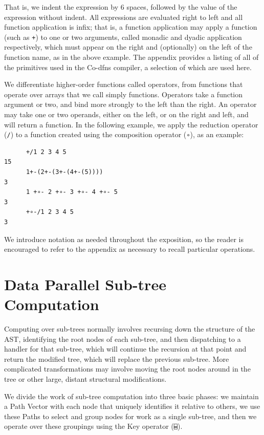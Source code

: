 ﻿\documentclass[numbers,10pt,preprint]{sigplanconf}
\begin{document}
\noindent That is, we indent the expression by 6 spaces, followed by the value of the expression without indent. All expressions are evaluated right to left and all function application is infix; that is, a function application may apply a function (such as \verb;+;) to one or two arguments, called monadic and dyadic application respectively, which must appear on the right and (optionally) on the left of the function name, as in the above example. The appendix provides a listing of all of the primitives used in the Co-dfns compiler, a selection of which are used here.

We differentiate higher-order functions called operators, from functions that operate over arrays that we call simply functions. Operators take a function argument or two, and bind more strongly to the left than the right. An operator may take one or two operands, either on the left, or on the right and left, and will return a function. In the following example, we apply the reduction operator (\verb;/;) to a function created using the composition operator (\verb;∘;), as an example:

\begin{verbatim}
      +/1 2 3 4 5
15
      1+-(2+-(3+-(4+-(5))))
3
      1 +∘- 2 +∘- 3 +∘- 4 +∘- 5
3
      +∘-/1 2 3 4 5
3
\end{verbatim}

\noindent We introduce notation as needed throughout the exposition, so the reader is encouraged to refer to the appendix as necessary to recall particular operations.

\section{Data Parallel Sub-tree Computation}

Computing over sub-trees normally involves recursing down the structure of the AST, identifying the root nodes of each sub-tree, and then dispatching to a handler for that sub-tree, which will continue the recursion at that point and return the modified tree, which will replace the previous sub-tree. More complicated transformations may involve moving the root nodes around in the tree or other large, distant structural modifications.

We divide the work of sub-tree computation into three basic phases: we maintain a Path Vector with each node that uniquely identifies it relative to others, we use these Paths to select and group nodes for work as a single sub-tree, and then we operate over these groupings using the Key operator (\verb;⌸;).
\end{document}
